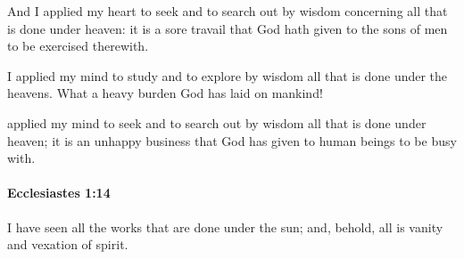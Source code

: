 			\begin{versebox}
					\item[BHS] 
					\item[LXX] 
					\item[ASV] And I applied my heart to seek and to search out by wisdom concerning all that is done under heaven: it is a sore travail that God hath given to the sons of men to be exercised therewith.
					\item[NIV] I applied my mind to study and to explore by wisdom all that is done under the heavens. What a heavy burden God has laid on mankind!
					\item[NRSV] applied my mind to seek and to search out by wisdom all that is done under heaven; it is an unhappy business that God has given to human beings to be busy with.
			\end{versebox}

		\paragraph{Ecclesiastes 1:14} %
			\label{ECCLESIASTES-1-14}

			I have seen all the works that are done under the sun; and, behold, all is vanity and vexation of spirit.

